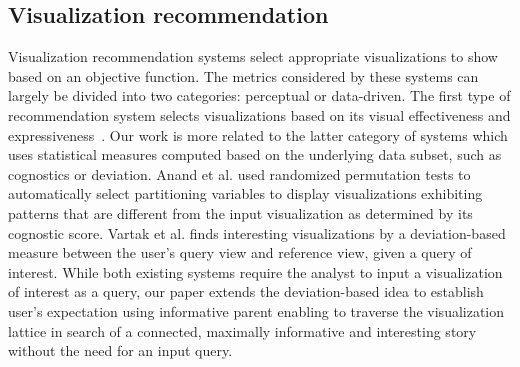 \subsection{Visualization recommendation}
\par%
Visualization recommendation systems select appropriate visualizations to show based on an objective function. The metrics considered by these systems can largely be divided into two categories: perceptual or data-driven. The first type of recommendation system selects visualizations based on its visual effectiveness and expressiveness~\cite{Wongsuphasawat2016,Mackinlay2007}. Our work is more related to the latter category of systems which uses statistical measures computed based on the underlying data subset, such as cognostics or deviation. Anand et al. \cite{Anand2015} used randomized permutation tests to automatically select partitioning variables to display visualizations exhibiting patterns that are different from the input visualization as determined by its cognostic score. Vartak et al. \cite{Vartak2015} finds interesting visualizations by a deviation-based measure between the user's query view and reference view, given a query of interest. While both existing systems require the analyst to input a visualization of interest as a query, our paper extends the deviation-based idea to establish user's expectation using informative parent enabling \system to traverse the visualization lattice in search of a connected, maximally informative and interesting story without the need for an input query.  %


